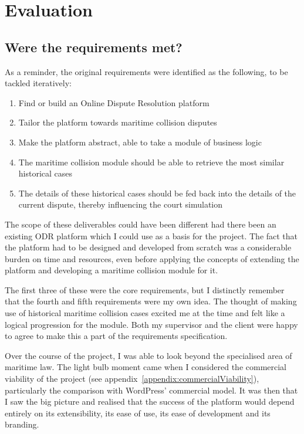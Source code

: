 \chapter{Evaluation}

\section{Were the requirements met?}

As a reminder, the original requirements were identified as the following, to be tackled iteratively:

\begin{enumerate}

    \item Find or build an Online Dispute Resolution platform
    
    \item Tailor the platform towards maritime collision disputes

    \item Make the platform abstract, able to take a module of business logic
    
    \item The maritime collision module should be able to retrieve the most similar historical cases

    \item The details of these historical cases should be fed back into the details of the current dispute, thereby influencing the court simulation

\end{enumerate}

The scope of these deliverables could have been different had there been an existing ODR platform which I could use as a basis for the project. The fact that the platform had to be designed and developed from scratch was a considerable burden on time and resources, even before applying the concepts of extending the platform and developing a maritime collision module for it.

The first three of these were the core requirements, but I distinctly remember that the fourth and fifth requirements were my own idea. The thought of making use of historical maritime collision cases excited me at the time and felt like a logical progression for the module. Both my supervisor and the client were happy to agree to make this a part of the requirements specification.

Over the course of the project, I was able to look beyond the specialised area of maritime law. The light bulb moment came when I considered the commercial viability of the project (see appendix~\ref{appendix:commercialViability}), particularly the comparison with WordPress' commercial model. It was then that I saw the big picture and realised that the success of the platform would depend entirely on its extensibility, its ease of use, its ease of development and its branding.

